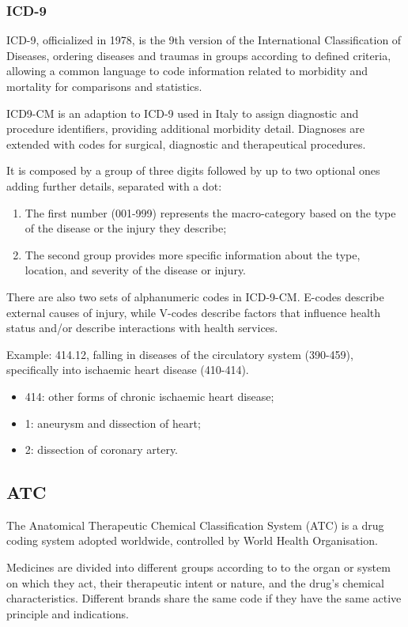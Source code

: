 \subsubsection{ICD-9}
ICD-9, officialized in 1978, is the 9th version of the International Classification of Diseases, ordering diseases and traumas in groups according to defined criteria, allowing a common language to code information related to morbidity and mortality for comparisons and statistics\cite{icdit}.

ICD9-CM is an adaption to ICD-9 used in Italy to assign diagnostic and procedure identifiers, providing additional morbidity detail. Diagnoses are extended with codes for surgical, diagnostic and therapeutical procedures. 

It is composed by a group of three digits followed by up to two optional ones adding further details, separated with a dot:
\begin{enumerate}
	\item The first number (001-999) represents the macro-category based on the type of the disease or the injury they describe;
	\item The second group provides more specific information about the type, location, and severity of the disease or injury.
\end{enumerate}

There are also two sets of alphanumeric codes in ICD-9-CM. E-codes describe external causes of injury, while V-codes describe factors that influence health status and/or describe interactions with health services\cite{icd9en}.

Example: 414.12, falling in diseases of the circulatory system (390-459), specifically into ischaemic heart disease (410-414).
\begin{itemize}
	\item 414: other forms of chronic ischaemic heart disease;
		\item 1: aneurysm and dissection of heart;
			\item 2: dissection of coronary artery.
\end{itemize}

\subsection{ATC}
The Anatomical Therapeutic Chemical Classification System (ATC) is a drug coding system adopted worldwide, controlled by World Health Organisation.

Medicines are divided into different groups according to to the organ or system on which they act, their therapeutic intent or nature, and the drug's chemical characteristics. Different brands share the same code if they have the same active principle and indications.

